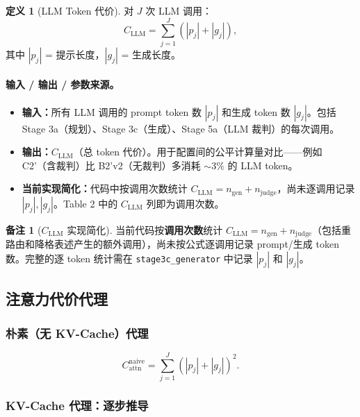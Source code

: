 \documentclass[11pt,a4paper]{article}
\theoremstyle{definition}
\newtheorem{definition}{定义}[section]
\newtheorem{remark}{备注}[section]
\begin{document}
\begin{definition}[LLM Token 代价]
对 $J$ 次 LLM 调用：
\begin{equation}\label{eq:cllm}
C_{\mathrm{LLM}} = \sum_{j=1}^{J} (|p_j| + |g_j|),
\end{equation}
其中 $|p_j|$ = 提示长度，$|g_j|$ = 生成长度。

\paragraph{输入 / 输出 / 参数来源。}
\begin{itemize}[nosep]
    \item \textbf{输入：}所有 LLM 调用的 prompt token 数 $|p_j|$ 和生成 token 数 $|g_j|$。包括 Stage 3a（规划）、Stage 3c（生成）、Stage 5a（LLM 裁判）的每次调用。
    \item \textbf{输出：}$C_{\mathrm{LLM}}$（总 token 代价）。用于配置间的公平计算量对比——例如 C2'（含裁判）比 B2'v2（无裁判）多消耗 $\sim 3\%$ 的 LLM token。
    \item \textbf{当前实现简化：}代码中按调用次数统计 $C_{\mathrm{LLM}} = n_{\mathrm{gen}} + n_{\mathrm{judge}}$，尚未逐调用记录 $|p_j|, |g_j|$。Table 2 中的 $C_{\mathrm{LLM}}$ 列即为调用次数。
\end{itemize}
\end{definition}

\begin{remark}[$C_{\mathrm{LLM}}$ 实现简化]
当前代码按\textbf{调用次数}统计 $C_{\mathrm{LLM}} = n_{\mathrm{gen}} + n_{\mathrm{judge}}$（包括重路由和降格表述产生的额外调用），尚未按公式逐调用记录 prompt/生成 token 数。完整的逐 token 统计需在 \texttt{stage3c\_generator} 中记录 $|p_j|$ 和 $|g_j|$。
\end{remark}

\subsection{注意力代价代理}

\subsubsection{朴素（无 KV-Cache）代理}
\begin{equation}\label{eq:naive}
C_{\mathrm{attn}}^{\mathrm{naive}} = \sum_{j=1}^{J} (|p_j| + |g_j|)^2.
\end{equation}

\subsubsection{KV-Cache 代理：逐步推导}
\end{document}
